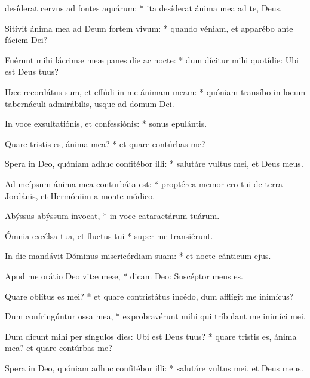 \begin{psalmus}

 desíderat cervus ad fontes aquárum: * ita desíderat ánima mea ad te, Deus.

Sitívit ánima mea ad Deum fortem vivum: * quando véniam, et apparébo ante fáciem Dei?

Fuérunt mihi lácrimæ meæ panes die ac nocte: * dum dícitur mihi quotídie: Ubi est Deus tuus?

Hæc recordátus sum, et effúdi in me ánimam meam: * quóniam transíbo in locum tabernáculi admirábilis, usque ad domum Dei.

In voce exsultatiónis, et confessiónis: * sonus epulántis.

Quare tristis es, ánima mea? * et quare contúrbas me?

Spera in Deo, quóniam adhuc confitébor illi: * salutáre vultus mei, et Deus meus.

Ad meípsum ánima mea conturbáta est: * proptérea memor ero tui de terra Jordánis, et Hermóniim a monte módico.

Abýssus abýssum ínvocat, * in voce cataractárum tuárum.

Ómnia excélsa tua, et fluctus tui * super me transiérunt.

In die mandávit Dóminus misericórdiam suam: * et nocte cánticum ejus.

Apud me orátio Deo vitæ meæ, * dicam Deo: Suscéptor meus es.

Quare oblítus es mei? * et quare contristátus incédo, dum afflígit me inimícus?

Dum confringúntur ossa mea, * exprobravérunt mihi qui tríbulant me inimíci mei.

Dum dicunt mihi per síngulos dies: Ubi est Deus tuus? * quare tristis es, ánima mea? et quare contúrbas me?

Spera in Deo, quóniam adhuc confitébor illi: * salutáre vultus mei, et Deus meus.

\end{psalmus}
